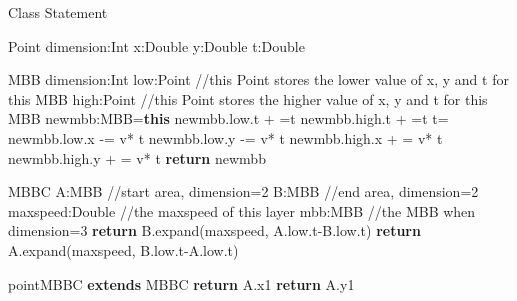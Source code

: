 \documentclass[sigplan]{acmart}
\begin{document}
\begin{algorithm}[ht]
\caption{Class Statement} \label{alg:class}



\begin{algorithmic}[ht]
\Ensure Point
    \State dimension:Int
    \State x:Double
    \State y:Double
    \State t:Double

\Ensure MBB
    \State dimension:Int
    \State low:Point //this Point stores the lower value of x, y and t for this MBB
    \State high:Point //this Point stores the higher value of x, y and t for this MBB
        \State newmbb:MBB=\textbf{this}
        \State newmbb.low.t + =t
        \State newmbb.high.t + =t
        \State t=
        \State newmbb.low.x -= v* t
        \State newmbb.low.y -= v* t
        \State newmbb.high.x + = v* t
        \State newmbb.high.y + = v* t
        \State \textbf{return} newmbb
    \EndFunction

\Ensure MBBC
    \State A:MBB //start area, dimension=2
    \State B:MBB //end area, dimension=2
    \State maxspeed:Double //the maxspeed of this layer
    \State mbb:MBB //the MBB when dimension=3
        \State \textbf{return} B.expand(maxspeed, A.low.t-B.low.t)
    \EndFunction
        \State \textbf{return} A.expand(maxspeed, B.low.t-A.low.t)
    \EndFunction

\Ensure pointMBBC \textbf{extends} MBBC
    \State \textbf{return} A.x1
    \EndFunction
    \State \textbf{return} A.y1
    \EndFunction
\end{algorithmic}
\end{algorithm}
\end{document}
